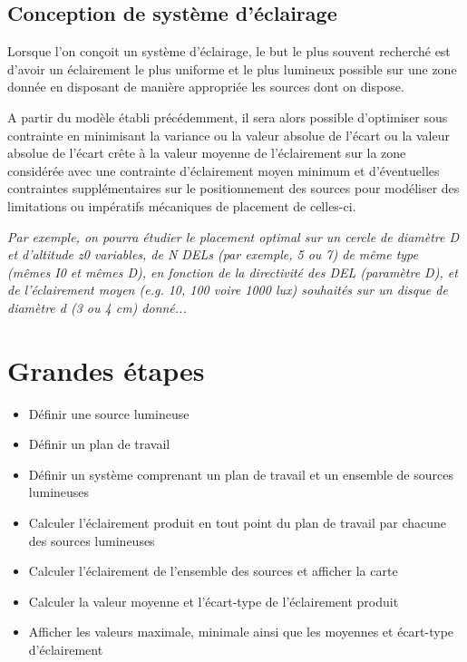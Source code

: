 \subsection{Conception de système d'éclairage}

Lorsque l'on conçoit un système d'éclairage, le but le plus souvent recherché est d'avoir un éclairement le plus uniforme et le plus lumineux possible sur une zone donnée en disposant de manière appropriée les sources dont on dispose. 

\medskip

A partir du modèle établi précédemment, il sera alors possible d'optimiser sous contrainte en minimisant la variance ou la valeur absolue de l'écart ou la valeur absolue de l'écart crête à la valeur moyenne de l'éclairement sur la zone considérée avec une contrainte d'éclairement moyen minimum et d'éventuelles contraintes supplémentaires sur le positionnement des sources pour modéliser des limitations ou impératifs mécaniques de placement de celles-ci.

\medskip

\textit{Par exemple, on pourra étudier le placement optimal sur un cercle de diamètre D et d'altitude z0 variables, de N DELs (par exemple, 5 ou 7) de même type (mêmes I0 et mêmes D), en fonction de la directivité des DEL (paramètre D), et de l'éclairement moyen (e.g. 10, 100 voire 1000 lux) souhaités sur un disque de diamètre d (3 ou 4 cm) donné... }


\section{Grandes étapes}

\begin{itemize}
	\item Définir une source lumineuse
	\item Définir un plan de travail
	\item Définir un système comprenant un plan de travail et un ensemble de sources lumineuses
	\item Calculer l'éclairement produit en tout point du plan de travail par chacune des sources lumineuses
	\item Calculer l'éclairement de l'ensemble des sources et afficher la carte
	\item Calculer la valeur moyenne et l'écart-type de l'éclairement produit
	\item Afficher les valeurs maximale, minimale ainsi que les moyennes et écart-type d'éclairement
\end{itemize}

